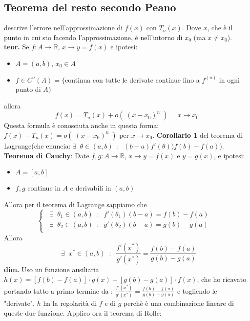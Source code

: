\subsection*{Teorema del resto secondo Peano}
descrive l'errore nell'approssimazione di $f(x)$ con $T_n(x)$. Dove $x$, che è il punto in cui sto facendo l'approssimazione, è nell'intorno di $x_0$ (ma $x\neq x_0$).\newline
\textbf{teor.}  Se $f: A \rightarrow \mathbb{R}$, $x \longrightarrow  y = f(x)$ e ipotesi:
\begin{itemize}
    \item $A=(a,b)$, $x_0 \in A$
    \item $f \in C^n(A) = \{$continua con tutte le derivate continue fino a $f^{(n)}$ in ogni punto di $A\}$
\end{itemize}
allora
\[
    f(x) = T_n(x) + o( \; (x-x_0)^n \; ) \;\;\;\;\; x \rightarrow x_0
\]
Questa formula è conosciuta anche in questa forma: $f(x) -T_n(x) = o( \; (x-x_0)^n \; )$ per $x \rightarrow x_0$.\newline
\newline
\textbf{Corollario 1} del teorema di Lagrange(che enuncia:$\;\exists\;\; \theta \in (a,b) \;\;:\;\; (b-a) f'(\theta) ) f(b) - f(a)$). \textbf{Teorema di Cauchy}:\newline
Date $f, g: A \rightarrow \mathbb{R}$, $x \rightarrow y=f(x)$ e $y=g(x)$, e ipotesi:
\begin{itemize}
    \item $A = [a,b]$
    \item $f,g $ continue in $A$ e derivabili in $(a,b)$
\end{itemize}
Allora per il teorema di Lagrange sappiamo che
\[
    \begin{cases}
        \;\;\exists\;\; \theta_1 \in (a,b) \;\;:\;\; f'(\theta_1)(b-a) = f(b) - f(a) &\\
        \;\;\exists\;\; \theta_2 \in (a,b) \;\;:\;\; g'(\theta_2)(b-a) = g(b) - g(a) &\\
    \end{cases}
\]
Allora 
\[
    \;\;\exists\;\; x^* \in (a,b) \;\;:\;\; \frac{f'(x^*)}{g'(x^*)} = \frac{f(b) - f(a)}{g(b) - g(a)}
\]
\textbf{dim.} Uso un funzione ausiliaria $h(x) = [f(b) - f(a)] \cdot  g(x) - [g(b) - g(a)] \cdot  f(x)$, che ho ricavato portando tutto a primo termine da : $\frac{f'(x^*)}{g'(x^*)} = \frac{f(b) - f(a)}{g(b) - g(a)}$ e togliendo le "derivate".\newline
$h$ ha la regolarità di $f$ e di $g$ perchè è una combinazione lineare di queste due funzione. Applico ora il teorema di Rolle:
